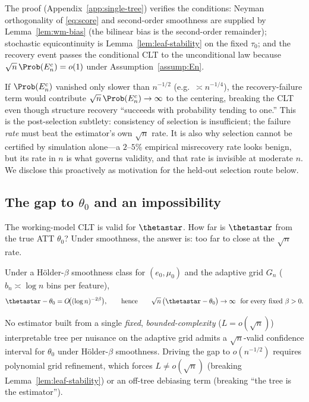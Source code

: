 The proof (Appendix~\ref{app:single-tree}) verifies the \citet{chen2022dml}
conditions: Neyman orthogonality of \eqref{eq:score} and second-order smoothness are
supplied by Lemma~\ref{lem:wm-bias} (the bilinear bias is the second-order remainder);
stochastic equicontinuity is Lemma~\ref{lem:leaf-stability} on the fixed $\tau_0$; and
the recovery event passes the conditional CLT to the unconditional law because
$\sqrt{n}\,\Prob(E_n^c) = o(1)$ under Assumption~\ref{assump:En}.

\begin{remark}
\label{rem:rate-necessity}
If $\Prob(E_n^c)$ vanished only slower than $n^{-1/2}$ (e.g.\ $\asymp n^{-1/4}$), the
recovery-failure term would contribute $\sqrt{n}\,\Prob(E_n^c) \to \infty$ to the
centering, breaking the CLT even though structure recovery ``succeeds with probability
tending to one.'' This is the post-selection subtlety: consistency of selection is
insufficient; the failure \emph{rate} must beat the estimator's own $\sqrt{n}$ rate.
It is also why selection cannot be certified by simulation alone---a $2$--$5\%$
empirical misrecovery rate looks benign, but its rate in $n$ is what governs validity,
and that rate is invisible at moderate $n$. We disclose this proactively as motivation
for the held-out selection route below.
\end{remark}

\subsection{The gap to \texorpdfstring{$\theta_0$}{theta0} and an impossibility}
\label{sec:gap}

The working-model CLT is valid for $\thetastar$. How far is $\thetastar$ from the true
ATT $\theta_0$? Under smoothness, the answer is: too far to close at the $\sqrt{n}$
rate.

\begin{proposition}
\label{prop:gap}
Under a H\"older-$\beta$ smoothness class for $(e_0, \mu_0)$ and the adaptive grid
$G_n$ ($b_n \asymp \log n$ bins per feature),
\[
\thetastar - \theta_0 = O\!\bigl((\log n)^{-2\beta}\bigr),
\qquad\text{hence}\qquad
\sqrt{n}\,\bigl(\thetastar - \theta_0\bigr) \to \infty
\ \text{ for every fixed } \beta > 0.
\]
\end{proposition}

\begin{corollary}
\label{cor:impossible}
No estimator built from a single \emph{fixed}, \emph{bounded-complexity}
($L = o(\sqrt{n})$) interpretable tree per nuisance on the adaptive grid admits a
$\sqrt{n}$-valid confidence interval for $\theta_0$ under H\"older-$\beta$ smoothness.
Driving the gap to $o(n^{-1/2})$ requires polynomial grid refinement, which forces
$L \ne o(\sqrt{n})$ (breaking Lemma~\ref{lem:leaf-stability}) or an off-tree debiasing
term (breaking ``the tree is the estimator'').
\end{corollary}

